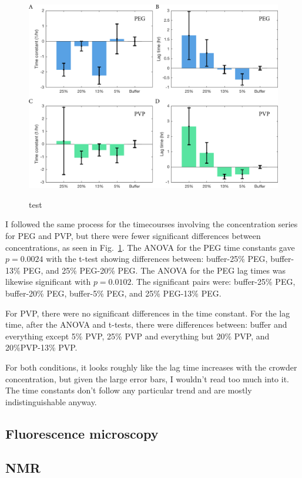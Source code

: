 \begin{figure}
\caption{test}
\centering
\includegraphics[width=\textwidth]{figs/ch05/peg-and-pvp-charts}
\label{fig:peg-pvp}
\end{figure}

I followed the same process for the timecourses involving the concentration series for PEG and PVP, but there were fewer significant differences between concentrations, as seen in Fig.~\ref{fig:peg-pvp}.  The ANOVA for the PEG time constants gave $p=0.0024$ with the t-test showing differences between: buffer-25\% PEG, buffer-13\% PEG, and 25\% PEG-20\% PEG. The ANOVA for the PEG lag times was likewise significant with $p = 0.0102$.  The significant pairs were: buffer-25\% PEG, buffer-20\% PEG, buffer-5\% PEG, and 25\% PEG-13\% PEG.

For PVP, there were no significant differences in the time constant.  For the lag time, after the ANOVA and t-tests, there were differences between: buffer and everything except 5\% PVP, 25\% PVP and everything but 20\% PVP, and 20\%PVP-13\% PVP.

For both conditions, it looks roughly like the lag time increases with the crowder concentration, but given the large error bars, I wouldn't read too much into it.  The time constants don't follow any particular trend and are mostly indistinguishable anyway.

\subsection{Fluorescence microscopy}
\subsection{NMR}

